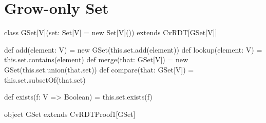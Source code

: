 
%


\chapter{Grow-only Set}
\label{app:grow_set}

\begin{Scala}
class GSet[V](set: Set[V] = new Set[V]()) extends CvRDT[GSet[V]] {
  def add(element: V) = new GSet(this.set.add(element))
  def lookup(element: V) = this.set.contains(element)
  def merge(that: GSet[V]) = new GSet(this.set.union(that.set))
  def compare(that: GSet[V]) = this.set.subsetOf(that.set)

  def exists(f: V => Boolean) = this.set.exists(f)
}

object GSet extends CvRDTProof1[GSet]
\end{Scala}
